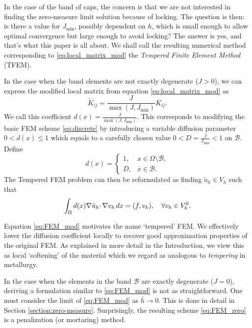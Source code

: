 \documentclass{article}
\theoremstyle{remark}
\def \d {{\rm d}}
\def\dx{\,\d x }
\def\B{\mathcal{B}}
\def\tu{\tilde{u}}
\def\width{\bar{h}}
\newcommand{\J}{J}
\newcommand{\Jmin}{J_{\text{min}}}
\begin{document}
In the case of the band of caps, the concern is that we are not interested in finding the zero-measure limit solution because of locking. The question is then: is there a value for $\Jmin$, possibly dependent on $h$, which is small enough to allow optimal convergence but large 
enough to avoid locking? The answer is yes, and that's what this paper is all about. We shall call the resulting numerical method corresponding to \eqref{eq:local_matrix_mod} the \emph{Tempered Finite Element Method} (TFEM).

In the case when the band elements are not exactly degenerate ($\J > 0$), we can express the modified local matrix from equation \eqref{eq:local_matrix_mod} as
\begin{equation} \label{eq:Ktilde_K}
     \tilde K_{ij}
  = \frac{\J}{\max(\J, \Jmin)} K_{ij}.
\end{equation}
We call this coefficient $d(x) = \frac{\J}{\max(\J, \Jmin)}$. This corresponds to modifying the basic FEM scheme \eqref{eq:discrete} by introducing a variable diffusion parameter $0<d(x)\leq 1$ which equals to a carefully chosen value $0<D = \frac{\J}{\Jmin}<1$ on $\B$. Define 
\begin{equation}
d(x)=\begin{cases}
1,& x\in\Omega\setminus\B,\\
D,& x\in\B.
\end{cases}
\label{eq:def_D}
\end{equation}
The Tempered FEM problem can then be reformulated as finding $\tu_h\in V_h$ such that
\begin{equation}
\int_\Omega d(x)\nabla \tu_h\cdotp\nabla v_h \dx=(f,v_h),\quad\forall v_h\in V_h^0.
\label{eq:FEM_mod}
\end{equation}

Equation \eqref{eq:FEM_mod} motivates the name `tempered' FEM. We effectively lower the diffusion coefficient locally to recover good approximation properties of the original FEM. As explained in more detail in the Introduction, we view this as local `softening' of the material which we regard as analogous to \emph{tempering} in metallurgy.

In the case when the elements in the band $\B$ are exactly degenerate ($J=0$), deriving a formulation similar to \eqref{eq:FEM_mod} is not as straightforward. One must consider the limit of \eqref{eq:FEM_mod} as $\width\to 0$. This is done in detail in Section \ref{section:zero-measure}. Surprisingly, the resulting scheme \eqref{eq:FEM_zero} is a penalization (or mortaring) method.
\end{document}
